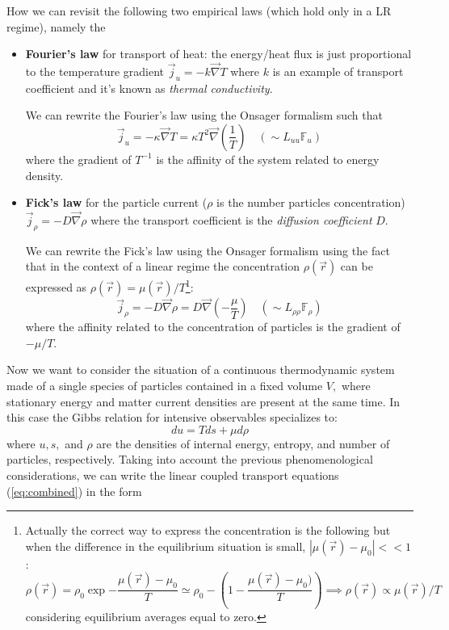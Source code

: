 \documentclass[\main/main.tex]{subfiles}
\begin{document}
How we can revisit the following two empirical laws (which hold only in a LR regime), namely the 
\begin{itemize}
    \item \textbf{Fourier's law} for transport of heat: the energy/heat flux is just proportional to the temperature gradient $\vec{j}_u=-k\Vec{\nabla}T$ where $k$ is an example of transport coefficient and it's known as \textit{thermal conductivity}. 
    
    We can rewrite the Fourier's law using the Onsager formalism such that
    \begin{equation}
        \vec{j}_u=-\kappa\Vec{\nabla}T=\kappa T^2\Vec{\nabla}\left(\frac{1}{T}\right) \quad\left( \sim L_{uu}\mathbb{F}_u\right)
    \end{equation}
    where the gradient of $T^{-1}$ is the affinity of the system related to energy density.
    \item \textbf{Fick's law} for the particle current ($\rho$ is the number particles concentration) $\Vec{j}_\rho=-D\Vec{\nabla}\rho$ where the transport coefficient is the \textit{diffusion coefficient} $D$.
    
    We can rewrite the Fick's law using the Onsager formalism using the fact that in the context of a linear regime the concentration $\rho(\Vec{r})$ can be expressed as $\rho(\Vec{r}){=}\mu(\Vec{r})/T$\footnote{Actually the correct way to express the concentration is the following but when the difference in the equilibrium situation is small, $|\mu(\Vec{r})-\mu_0|<<1$:
    \[
    \rho(\Vec{r})=\rho_0 \exp{-\frac{\mu(\Vec{r})-\mu_0}{T}} \simeq \rho_0 - \left(1- \frac{\mu(\vec{r})-\mu_0)}{T}\right) \implies \rho(\Vec{r})\propto\mu(\Vec{r})/T 
    \]
    considering equilibrium averages equal to zero.
    }:
    \begin{equation}
        \Vec{j}_\rho=-D\Vec{\nabla}\rho=D\Vec{\nabla}\left(-\frac{\mu}{T}\right) \quad\left( \sim L_{\rho\rho}\mathbb{F}_\rho\right)
    \end{equation}
    where the affinity related to the concentration of particles is the gradient of $-\mu/T$.
\end{itemize}

Now we want to consider the situation of a continuous thermodynamic system made of a single species of particles contained in a fixed volume $V,$ where stationary energy and matter current densities are present at the same time. In this case the Gibbs relation for intensive observables specializes to:
$$
d u=T d s+\mu d \rho
$$
where $u, s,$ and $\rho$ are the densities of internal energy, entropy, and number of particles, respectively. Taking into account the previous phenomenological considerations, we can write the linear coupled transport equations (\ref{eq:combined}) in the form
\end{document}

